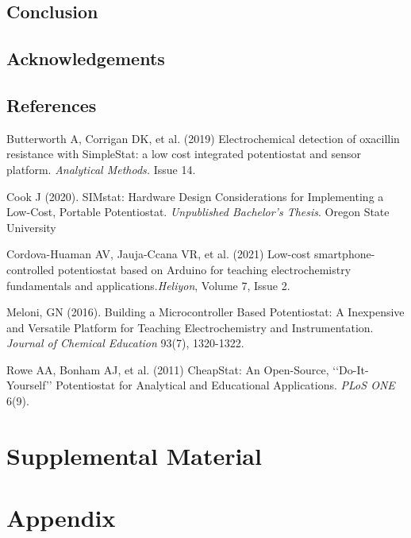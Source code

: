 \documentclass{article}
\begin{document}
\subsection*{Conclusion}
\subsection*{Acknowledgements}
\subsection*{References}
Butterworth A, Corrigan DK, et al. (2019) Electrochemical detection of oxacillin resistance with SimpleStat: a low cost integrated potentiostat and sensor platform. \emph{Analytical Methods.} Issue 14. 

Cook J (2020). SIMstat: Hardware Design Considerations for Implementing a Low-Cost, Portable Potentiostat. \emph{Unpublished Bachelor's Thesis}. Oregon State University

Cordova-Huaman AV, Jauja-Ccana VR, et al. (2021) Low-cost smartphone-controlled potentiostat based on Arduino for teaching electrochemistry fundamentals and applications.\emph{Heliyon}, Volume 7, Issue 2. 

Meloni, GN (2016). Building a Microcontroller Based Potentiostat: A Inexpensive and Versatile Platform for Teaching Electrochemistry and Instrumentation. \emph{Journal of Chemical Education} 93(7), 1320-1322. 

Rowe AA, Bonham AJ, et al. (2011) CheapStat: An Open-Source, ‘‘Do-It-Yourself’’ Potentiostat for Analytical and Educational Applications. \emph{PLoS ONE} 6(9).

\newpage
\section*{Supplemental Material}

\newpage
\section*{Appendix}
\end{document}
